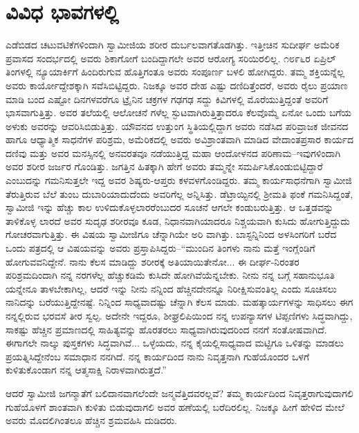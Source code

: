 
\chapter{ವಿವಿಧ ಭಾವಗಳಲ್ಲಿ}

\noindent

ಎಡೆಬಿಡದ ಚಟುವಟಿಕೆಗಳಿಂದಾಗಿ ಸ್ವಾಮೀಜಿಯ ಶರೀರ ದುರ್ಬಲವಾಗತೊಡಗಿತ್ತು. ಇತ್ತೀಚಿನ ಸುದೀರ್ಘ ಅಮೆರಿಕ ಪ್ರವಾಸದ ಸಂದರ್ಭದಲ್ಲಿ ಅವರು ಶಿಕಾಗೋಗೆ ಬಂದಿದ್ದಾಗಲೇ ಅವರ ಆರೋಗ್ಯ ಸರಿಯಿರಲಿಲ್ಲ. ೧೮೯೬ರ ಏಪ್ರಿಲ್ ತಿಂಗಳಲ್ಲಿ ನ್ಯೂಯಾರ್ಕಿಗೆ ಹಿಂದಿರುಗುವ ಹೊತ್ತಿಗಂತೂ ಅವರು ಸಂಪೂರ್ಣ ಬಳಲಿ ಹೋಗಿದ್ದರು. ತಮ್ಮ ಶಕ್ತಿಯನ್ನೆಲ್ಲ ಅವರು ಕಾರ್ಯೋದ್ದೇಶಕ್ಕಾಗಿ ಸವೆಸಿಬಿಟ್ಟಿದ್ದರು. ನಿಜಕ್ಕೂ ಅವರ ದೇಹ ಎಷ್ಟು ದಣಿದಿತ್ತೆಂದರೆ, ಅವರು ರೈಲು ಪ್ರಯಾಣ ಮಾಡಿ ಬಂದ ಎಷ್ಟೋ ದಿನಗಳವರೆಗೂ ಟ್ರೈನಿನ ಚಕ್ರಗಳ ಗಢಗಢ ಸದ್ದು ಕಿವಿಗಳಲ್ಲಿ ಮೊರೆಯುತ್ತಿದ್ದಂತೆ ಅವರಿಗೆ ಭಾಸವಾಗುತ್ತಿತ್ತು. ಅವರ ತಲೆಯಲ್ಲಿ ಆಲೋಚನೆ ಗಳೆಲ್ಲ ಸ್ಫುಟವಾಗಿರುತ್ತಿತ್ತಾದರೂ ಕೆಲವೊಮ್ಮೆ ಏನೋ ಒಂದು ಬಗೆಯ ಅಳುಕು ಅವರನ್ನು ಆವರಿಸಿಬಿಡುತ್ತಿತ್ತು. ಯೌವನದ ಉತ್ತುಂಗ ಸ್ಥಿತಿಯಲ್ಲಿದ್ದಾಗ ಅವರು ನಡೆಸಿದ ಪರಿವ್ರಾಜಕ ಜೀವನದ ಹಾಗೂ ಆಧ್ಯಾತ್ಮಿಕ ಸಾಧನೆಗಳ ಪರಿಶ್ರಮ, ಅಮೆರಿಕದಲ್ಲಿ ಅವರು ಅವಿಶ್ರಾಂತವಾಗಿ ಮಾಡಿದ ವೇದಾಂತಪ್ರಸಾರ ಕಾರ್ಯದ ದಣಿವು ಮತ್ತು ಅವರ ಮನಸ್ಸಿನಲ್ಲಿ ಅನವರತವೂ ನಡೆಯುತ್ತಿದ್ದ ಮಹಾ ಆಂದೋಳನದ ಪರಿಣಾಮ–ಇವುಗಳಿಂದಾಗಿ ಅವರ ಶರೀರ ಜರ್ಜರ ಗೊಂಡಿತ್ತು. ಜಗತ್ತಿನ ಹಿತಕ್ಕಾಗಿ ಹೇಗೆ ಅವರು ತಮ್ಮನ್ನೇ ಸಮರ್ಪಿಸಿಕೊಂಡುಬಿಟ್ಟಿದ್ದಾರೆ ಎಂಬುದನ್ನು ಗಮನಿಸುತ್ತಲೇ ಇದ್ದ ಅವರ ಶಿಷ್ಯರು-ಆಪ್ತರು ಕಳವಳಗೊಂಡಿದ್ದರು. ತಮ್ಮ ಕಾರ್ಯಸಾಧನೆಗಾಗಿ ಸ್ವಾಮೀಜಿ ತೆರುತ್ತಿರುವ ಬೆಲೆ ತುಂಬ ದುಬಾರಿಯಾದುದೆಂದು ಅವರಿಗೆಲ್ಲ ಅನ್ನಿಸಿತ್ತು. ಡೆಟ್ರಾಯ್ಟಿನಲ್ಲಿ ಶ್ರೀಮತಿ ಫಂಕೆ ಗಮನಿಸಿದ್ದಂತೆ, ಸ್ವಾಮೀಜಿ ಇನ್ನು ಹೆಚ್ಚು ಕಾಲ ಉಳಿದುಕೊಳ್ಳಲಾರರೆಂಬುದರ ಸೂಚನೆ ಆಗಲೇ ಕಂಡುಬರುತ್ತಿತ್ತು. ಆ ಒತ್ತಡವನ್ನು ತಾಳಿಕೊಳ್ಳ ಲಾರದೆ ಅವರ ಸುದೃಢ ಶರೀರವೂ ಕೂಡ, ನಿಧಾನವಾಗಿಯಾದರೂ ನಿಶ್ಚಯವಾಗಿ ಕುಸಿದು ಹೋಗುತ್ತಿದ್ದುದು ಗೋಚರವಾಗುತ್ತಿತ್ತು. ಈ ವಿಷಯ ಸ್ವಾಮೀಜಿಗೂ ಚೆನ್ನಾಗಿಯೇ ಅರಿ ವಾಗಿತ್ತು. ಬಾಸ್ಟನ್ನಿನಿಂದ ಅಳಸಿಂಗರಿಗೆ ಬರೆದ ಒಂದು ಪತ್ರದಲ್ಲಿ ಆ ವಿಷಯವನ್ನು ಅವರು ಪ್ರಸ್ತಾಪಿಸಿದ್ದರು–“ಮುಂದಿನ ತಿಂಗಳು ನಾನು ಮತ್ತೆ ಇಂಗ್ಲೆಂಡಿಗೆ ಹೋಗುವವನಿದ್ದೇನೆ. ನಾನು ಕೆಲಸ ಮಾಡಿದ್ದು ಶರೀರಕ್ಕೆ ಅತಿಯಾಯಿತೇನೋ... ಈ ದೀರ್ಘ-ನಿರಂತರ ಪರಿಶ್ರಮದಿಂದಾಗಿ ನನ್ನ ನರಗಳೆಲ್ಲ ಹೆಚ್ಚುಕಡಿಮೆ ಕುಸಿದೇ ಹೋಗಿವೆಯೆನ್ನಬೇಕು. ನೀನು ನನ್ನ ಬಗ್ಗೆ ಸಹಾನುಭೂತಿ ಯನ್ನೇನೂ ತಾಳಬೇಕಾಗಿಲ್ಲ, ಆದರೆ ಇನ್ನು ನೀನು ನನ್ನಿಂದ ಹೆಚ್ಚಿನದೇನನ್ನೂ ನಿರೀಕ್ಷಿಸುವಂತಿಲ್ಲ ಎಂದು ಸೂಚಿಸಲು ನಾನಿದನ್ನು ಬರೆಯುತ್ತಿದ್ದೇನಷ್ಟೆ. ನಿನ್ನಿಂದ ಸಾಧ್ಯವಾದಷ್ಟು ಚೆನ್ನಾಗಿ ಕೆಲಸ ಮಾಡು. ಮಹತ್ಕಾರ್ಯಗಳನ್ನು ಸಾಧಿಸಲು ಈಗ ನನ್ನಲ್ಲಿರುವ ಭರವಸೆ ತೀರ ಸ್ವಲ್ಪ. ಅದೇನೇ ಇದ್ದರೂ, ಶೀಘ್ರಲಿಪಿಯಿಂದ ನನ್ನ ಉಪನ್ಯಾಸಗಳ ಟಿಪ್ಪಣಿಗಳು ಸಿದ್ಧವಾಗಿದ್ದು, ಸಾಕಷ್ಟು ಹೆಚ್ಚಿನ ಪ್ರಮಾಣದಲ್ಲಿ ಸಾಹಿತ್ಯವನ್ನು ಹೊರತರಲು ಸಾಧ್ಯವಾಗಿರುವುದರಿಂದ ನನಗೆ ಸಂತೋಷವಾಗಿದೆ. ಈಗಾಗಲೇ ನಾಲ್ಕು ಪುಸ್ತಕಗಳು ಸಿದ್ಧವಾಗಿವೆ... ಒಳ್ಳೆಯದು, ನನ್ನ ಕೈಯಲ್ಲಿಸಾಧ್ಯವಾದ ಮಟ್ಟಿಗೂ ಒಳಿತನ್ನು ಮಾಡಲು ಪ್ರಯತ್ನಿಸಿದ್ದೇನೆಂಬ ಸಮಾಧಾನ ನನಗಿದೆ. ನನ್ನ ಕಾರ್ಯದಿಂದ ನಾನು ನಿವೃತ್ತನಾಗಿ ಗುಹೆಯೊಂದರ ಒಳಗೆ ಕುಳಿತುಕೊಂಡಾಗ ನನ್ನ ಆತ್ಮಸಾಕ್ಷಿ ನಿರಾಳವಾಗಿರುತ್ತದೆ.”

ಆದರೆ ಸ್ವಾಮೀಜಿ ಜಗನ್ಮಾತೆಗೆ ಬಲಿದಾನವಾಗಲೆಂದೇ ಜನ್ಮವೆತ್ತಿದವರಲ್ಲವೆ? ತಮ್ಮ ಕಾರ್ಯದಿಂದ ನಿವೃತ್ತರಾಗುವುದಾಗಲಿ ಗುಹೆಯೊಳಗೆ ಶಾಂತವಾಗಿ ಕುಳಿತು ಬಿಡುವುದಾಗಲಿ ಅವರ ಹಣೆಯಲ್ಲಿ ಬರೆದಿರಲಿಲ್ಲ. ನಿಜಕ್ಕೂ ಹೀಗೆ ಹೇಳಿದ ಮೇಲೆ ಅವರು ಮೊದಲಿಗಿಂತಲೂ ಹೆಚ್ಚಿನ ಶ್ರಮವಹಿಸಿ ದುಡಿದರು.


